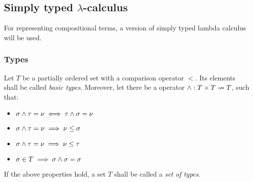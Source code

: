 \documentclass[main.tex]{subfiles}
\begin{document}
\subsection{Simply typed $\lambda$-calculus}

For representing compositional terms, a version of simply typed lambda calculus
will be used.

\subsubsection{Types}
\begin{defn}
    Let $T$ be a partially ordered
    set with a comparison operator $\less$.
    Its elements shall be called \emph{basic types}.
    Moreover, let there be a operator $\wedge : T \times T \nrightarrow T$,
    such that:
    \begin{itemize}
        \item $\sigma \wedge \tau = \nu \iff \tau \wedge \sigma = \nu$
        \item $\sigma \wedge \tau = \nu \implies \nu \leq \sigma$
        \item $\sigma \wedge \tau = \nu \implies \nu \leq \tau$
        \item $\sigma \in T       \implies \sigma \wedge \sigma = \sigma$
    \end{itemize}

    If the above properties hold, a set $T$ shall be called a \emph{set of types}.
\end{defn}
\end{document}
